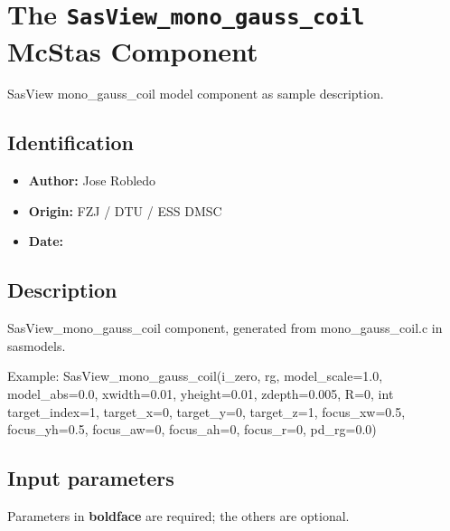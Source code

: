 \section{The \texttt{SasView\_mono\_gauss\_coil} McStas Component}
SasView mono\_gauss\_coil model component as sample description.

\subsection*{Identification}
\begin{itemize}
  \item \textbf{Author:} Jose Robledo
  \item \textbf{Origin:} FZJ / DTU / ESS DMSC
  \item \textbf{Date:} 
\end{itemize}

\subsection*{Description}
SasView\_mono\_gauss\_coil component, generated from mono\_gauss\_coil.c in sasmodels.

Example: SasView\_mono\_gauss\_coil(i\_zero, rg, model\_scale=1.0, model\_abs=0.0, xwidth=0.01, yheight=0.01, zdepth=0.005, R=0, int target\_index=1, target\_x=0, target\_y=0, target\_z=1, focus\_xw=0.5, focus\_yh=0.5, focus\_aw=0, focus\_ah=0, focus\_r=0, pd\_rg=0.0)

\subsection*{Input parameters}
Parameters in \textbf{boldface} are required; the others are optional.

